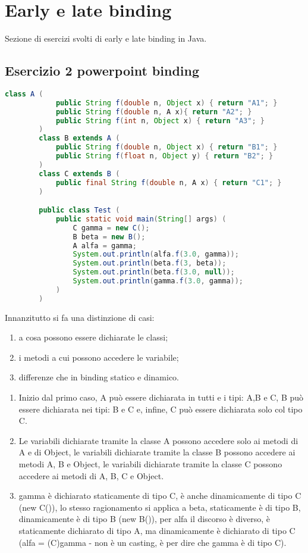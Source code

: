 \chapter{Early e late binding}

Sezione di esercizi svolti di early e late binding in Java.

\section{Esercizio 2 powerpoint binding}

    \begin{lstlisting}[language=java]
        class A (
            public String f(double n, Object x) { return "A1"; }
            public String f(double n, A x){ return "A2"; }
            public String f(int n, Object x) { return "A3"; }
        )
        class B extends A (
            public String f(double n, Object x) { return "B1"; }
            public String f(float n, Object y) { return "B2"; }
        )
        class C extends B (
            public final String f(double n, A x) { return "C1"; }
        )

        public class Test (
            public static void main(String[] args) (
                C gamma = new C();
                B beta = new B();
                A alfa = gamma;
                System.out.println(alfa.f(3.0, gamma));
                System.out.println(beta.f(3, beta));
                System.out.println(beta.f(3.0, null));
                System.out.println(gamma.f(3.0, gamma));
            )
        )
    \end{lstlisting}
    Innanzitutto si fa una distinzione di casi:
    \begin{enumerate}
        \item a cosa possono essere dichiarate le classi;
        \item i metodi a cui possono accedere le variabile;
        \item differenze che in binding statico e dinamico.
    \end{enumerate}

    \begin{enumerate}
        \item Inizio dal primo caso, A può essere dichiarata in tutti e \3 i tipi: A,B e C, B può essere
        dichiarata nei tipi: B e C e, infine, C può essere dichiarata solo col tipo C.
        \item Le variabili dichiarate tramite la classe A possono accedere solo ai metodi di A e di Object, 
        le variabili dichiarate tramite la classe B possono accedere ai metodi A, B e Object, le variabili
        dichiarate tramite la classe C possono accedere ai metodi di A, B, C e Object.
        \item gamma è dichiarato staticamente di tipo C, è anche dinamicamente di tipo C (new C()), lo stesso
        ragionamento si applica a beta, staticamente è di tipo B, dinamicamente è di tipo B (new B()), 
        per alfa il discorso è diverso, è staticamente dichiarato di tipo A, ma dinamicamente è dichiarato
        di tipo C (alfa = (C)gamma - non è un casting, è per dire che gamma è di tipo C).
    \end{enumerate}


